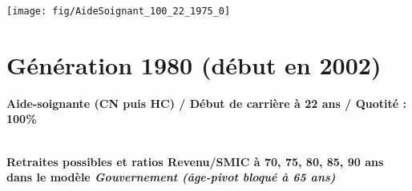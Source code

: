  \vspace{0.1cm} 

 {\hspace{-2.2cm}\texttt{[image: fig/AideSoignant\_100\_22\_1975\_0]}} 

\newpage 
 
\section{Génération 1980 (début en 2002)\label{AideSoignant_100_22_1980_0}} 
 
{\bf \noindent Aide-soignante (CN puis HC) / Début de carrière à 22 ans / Quotité : 100\%}  ~ 

 ~\\{\bf \noindent Retraites possibles et ratios Revenu/SMIC à 70, 75, 80, 85, 90 ans dans le modèle \emph{Gouvernement (âge-pivot bloqué à 65 ans)}}  
 

